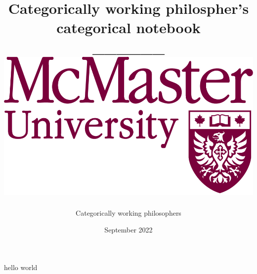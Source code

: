 \documentclass[12pt]{article}
\title{{Categorically working philospher's categorical notebook}\\
 ______\\
{\includegraphics[width=.3\textwidth]{university.jpg}}}
\author{Categorically working philosophers}
\date{September 2022}
\begin{document}
\maketitle

hello world

\printbibliography
\end{document}
